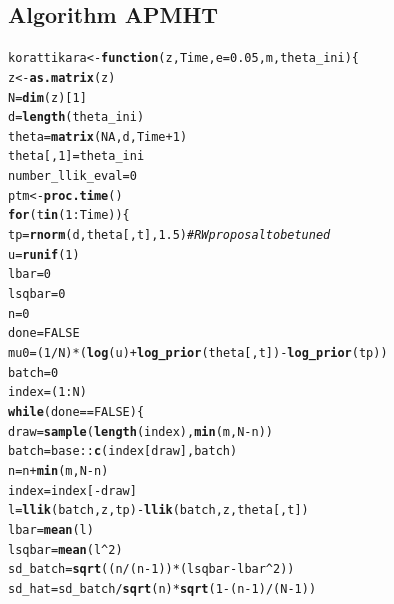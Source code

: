 \documentclass[11pt,a4paper]{report}\usepackage[]{graphicx}\usepackage[]{color}
\makeatletter
\newcommand{\hlnum}[1]{\textcolor[rgb]{0.686,0.059,0.569}{#1}}%
\newcommand{\hlcom}[1]{\textcolor[rgb]{0.678,0.584,0.686}{\textit{#1}}}%
\newcommand{\hlopt}[1]{\textcolor[rgb]{0,0,0}{#1}}%
\newcommand{\hlstd}[1]{\textcolor[rgb]{0.345,0.345,0.345}{#1}}%
\newcommand{\hlkwa}[1]{\textcolor[rgb]{0.161,0.373,0.58}{\textbf{#1}}}%
\newcommand{\hlkwb}[1]{\textcolor[rgb]{0.69,0.353,0.396}{#1}}%
\newcommand{\hlkwc}[1]{\textcolor[rgb]{0.333,0.667,0.333}{#1}}%
\newcommand{\hlkwd}[1]{\textcolor[rgb]{0.737,0.353,0.396}{\textbf{#1}}}%
\newenvironment{kframe}{%
 \def\at@end@of@kframe{}%
 \ifinner\ifhmode%
  \def\at@end@of@kframe{\end{minipage}}%
  \begin{minipage}{\columnwidth}%
 \fi\fi%
 \def\FrameCommand##1{\hskip\@totalleftmargin \hskip-\fboxsep
 \colorbox{shadecolor}{##1}\hskip-\fboxsep
     \hskip-\linewidth \hskip-\@totalleftmargin \hskip\columnwidth}%
 \MakeFramed {\advance\hsize-\width
   \@totalleftmargin\z@ \linewidth\hsize
   \@setminipage}}%
 {\par\unskip\endMakeFramed%
 \at@end@of@kframe}
\newenvironment{knitrout}{}{} %
\makeatother
\begin{document}
\begin{appendix}
\section{Algorithm APMHT}
\begin{knitrout}
\color{fgcolor}\begin{kframe}
\begin{alltt}
\hlstd{korattikara}\hlkwb{<-}\hlkwa{function}\hlstd{(}\hlkwc{z}\hlstd{,} \hlkwc{Time}\hlstd{,} \hlkwc{e}\hlstd{=}\hlnum{0.05}\hlstd{,} \hlkwc{m}\hlstd{,}\hlkwc{theta_ini}\hlstd{)\{}
  \hlstd{z}\hlkwb{<-}\hlkwd{as.matrix}\hlstd{(z)}
  \hlstd{N}\hlkwb{=}\hlkwd{dim}\hlstd{(z)[}\hlnum{1}\hlstd{]}
  \hlstd{d}\hlkwb{=}\hlkwd{length}\hlstd{(theta_ini)}
  \hlstd{theta}\hlkwb{=}\hlkwd{matrix}\hlstd{(}\hlnum{NA}\hlstd{,d,Time}\hlopt{+}\hlnum{1}\hlstd{)}
  \hlstd{theta[,}\hlnum{1}\hlstd{]}\hlkwb{=}\hlstd{theta_ini}
  \hlstd{number_llik_eval}\hlkwb{=}\hlnum{0}
  \hlstd{ptm} \hlkwb{<-} \hlkwd{proc.time}\hlstd{()}
  \hlkwa{for} \hlstd{(t} \hlkwa{in} \hlstd{(}\hlnum{1}\hlopt{:}\hlstd{Time)) \{}
    \hlstd{tp}\hlkwb{=}\hlkwd{rnorm}\hlstd{(d,theta[,t],}\hlnum{1.5}\hlstd{)} \hlcom{#RW proposal to be tuned}
    \hlstd{u}\hlkwb{=}\hlkwd{runif}\hlstd{(}\hlnum{1}\hlstd{)}
    \hlstd{lbar}\hlkwb{=}\hlnum{0}
    \hlstd{lsqbar}\hlkwb{=}\hlnum{0}
    \hlstd{n}\hlkwb{=}\hlnum{0}
    \hlstd{done}\hlkwb{=}\hlnum{FALSE}
    \hlstd{mu0}\hlkwb{=}\hlstd{(}\hlnum{1}\hlopt{/}\hlstd{N)}\hlopt{*}\hlstd{(}\hlkwd{log}\hlstd{(u)}\hlopt{+}\hlkwd{log_prior}\hlstd{(theta[,t])}\hlopt{-}\hlkwd{log_prior}\hlstd{(tp))}
    \hlstd{batch}\hlkwb{=}\hlnum{0}
    \hlstd{index}\hlkwb{=}\hlstd{(}\hlnum{1}\hlopt{:}\hlstd{N)}
    \hlkwa{while}\hlstd{(done}\hlopt{==}\hlnum{FALSE}\hlstd{) \{}
      \hlstd{draw}\hlkwb{=}\hlkwd{sample}\hlstd{(}\hlkwd{length}\hlstd{(index),}\hlkwd{min}\hlstd{(m,N}\hlopt{-}\hlstd{n))}
      \hlstd{batch}\hlkwb{=}\hlstd{base}\hlopt{::}\hlkwd{c}\hlstd{(index[draw],batch)}
      \hlstd{n}\hlkwb{=}\hlstd{n}\hlopt{+}\hlkwd{min}\hlstd{(m,N}\hlopt{-}\hlstd{n)}
      \hlstd{index}\hlkwb{=}\hlstd{index[}\hlopt{-}\hlstd{draw]}
      \hlstd{l}\hlkwb{=}\hlkwd{llik}\hlstd{(batch,z,tp)}\hlopt{-}\hlkwd{llik}\hlstd{(batch,z,theta[,t])}
      \hlstd{lbar}\hlkwb{=}\hlkwd{mean}\hlstd{(l)}
      \hlstd{lsqbar}\hlkwb{=}\hlkwd{mean}\hlstd{(l}\hlopt{^}\hlnum{2}\hlstd{)}
      \hlstd{sd_batch}\hlkwb{=}\hlkwd{sqrt}\hlstd{((n}\hlopt{/}\hlstd{(n}\hlopt{-}\hlnum{1}\hlstd{))}\hlopt{*}\hlstd{(lsqbar}\hlopt{-}\hlstd{lbar}\hlopt{^}\hlnum{2}\hlstd{))}
      \hlstd{sd_hat}\hlkwb{=}\hlstd{sd_batch}\hlopt{/}\hlkwd{sqrt}\hlstd{(n)}\hlopt{*}\hlkwd{sqrt}\hlstd{(}\hlnum{1}\hlopt{-}\hlstd{(n}\hlopt{-}\hlnum{1}\hlstd{)}\hlopt{/}\hlstd{(N}\hlopt{-}\hlnum{1}\hlstd{))}

\end{alltt}
\end{kframe}
\end{knitrout}
\end{appendix}
\end{document}
